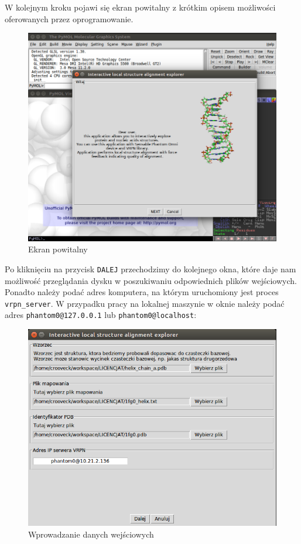 \documentclass[licencjacka]{pracamgr}
\begin{document}
W kolejnym kroku pojawi się ekran powitalny z krótkim opisem możliwości oferowanych przez oprogramowanie.

\begin{figure}[H]
\centering
\includegraphics[scale=0.4,center]{explorer_hello_en}
\caption{Ekran powitalny}
\end{figure}

Po kliknięciu na przycisk \texttt{DALEJ} przechodzimy do kolejnego okna, które daje nam możliwość przeglądania dysku w poszukiwaniu odpowiednich plików wejściowych. Ponadto należy podać adres komputera, na którym uruchomiony jest proces \texttt{vrpn\_server}. W przypadku pracy na lokalnej maszynie w oknie należy podać adres \texttt{phantom0@127.0.0.1} lub \texttt{phantom0@localhost}:

\begin{figure}[H]
\centering
\includegraphics[scale=0.7,center]{explorer_files_pl}
\caption{Wprowadzanie danych wejściowych}
\end{figure}
\end{document}
